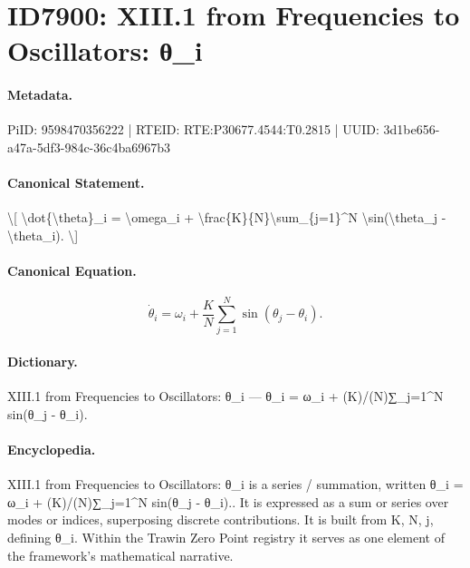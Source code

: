 \section*{ID7900: XIII.1 from Frequencies to Oscillators: θ\_i}
\paragraph{Metadata.}
PiID: 9598470356222 | RTEID: RTE:P30677.4544:T0.2815 | UUID: 3d1be656-a47a-5df3-984c-36c4ba6967b3

\paragraph{Canonical Statement.}
\textbackslash{}[ \textbackslash{}dot\{\textbackslash{}theta\}\_i = \textbackslash{}omega\_i + \textbackslash{}frac\{K\}\{N\}\textbackslash{}sum\_\{j=1\}\textasciicircum{}N \textbackslash{}sin(\textbackslash{}theta\_j - \textbackslash{}theta\_i). \textbackslash{}]

\paragraph{Canonical Equation.}
\[
\dot{\theta}_i = \omega_i + \frac{K}{N}\sum_{j=1}^N \sin(\theta_j - \theta_i).
\]

\paragraph{Dictionary.}
XIII.1 from Frequencies to Oscillators: θ\_i — θ\_i = ω\_i + (K)/(N)∑\_j=1\textasciicircum{}N sin(θ\_j - θ\_i).

\paragraph{Encyclopedia.}
XIII.1 from Frequencies to Oscillators: θ\_i is a series / summation, written θ\_i = ω\_i + (K)/(N)∑\_j=1\textasciicircum{}N sin(θ\_j - θ\_i).. It is expressed as a sum or series over modes or indices, superposing discrete contributions. It is built from K, N, j, defining θ\_i. Within the Trawin Zero Point registry it serves as one element of the framework's mathematical narrative.
